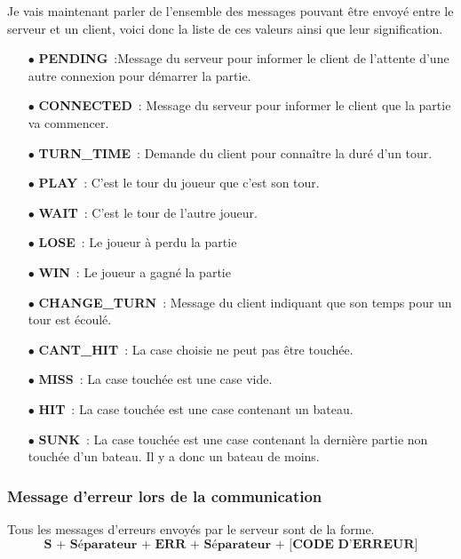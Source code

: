 \documentclass[12pt]{article}
\begin{document}
Je vais maintenant parler de l'ensemble des messages pouvant être envoyé entre
le serveur et un client, voici donc la liste de ces valeurs ainsi que leur
signification.
\begin{itemize}
      \item[$\bullet$] \textbf{PENDING} :Message du serveur pour informer
            le client de l'attente d'une autre connexion pour démarrer la
            partie.
            \bigskip
      \item[$\bullet$] \textbf{CONNECTED} : Message du serveur pour
            informer le client que la partie va commencer.
            \bigskip
      \item[$\bullet$] \textbf{TURN\_TIME} : Demande du client pour
            connaître la duré d'un tour.
            \bigskip
      \item[$\bullet$] \textbf{PLAY} : C'est le tour du joueur que c'est
            son tour.
            \bigskip
      \item[$\bullet$] \textbf{WAIT} : C'est le tour de l'autre joueur.
            \bigskip
      \item[$\bullet$] \textbf{LOSE} : Le joueur à perdu la partie
            \bigskip
      \item[$\bullet$] \textbf{WIN} : Le joueur a gagné la partie
            \bigskip
      \item[$\bullet$] \textbf{CHANGE\_TURN} : Message du client
            indiquant que son temps pour un tour est écoulé.
            \bigskip
      \item[$\bullet$] \textbf{CANT\_HIT} : La case choisie ne peut pas
            être touchée.
            \bigskip
      \item[$\bullet$] \textbf{MISS} : La case touchée est une case vide.
            \bigskip
      \item[$\bullet$] \textbf{HIT} : La case touchée est une case
            contenant un bateau.
            \bigskip
      \item[$\bullet$] \textbf{SUNK} : La case touchée est une case
            contenant la dernière partie non touchée d'un bateau. Il y a donc
            un bateau de
            moins.
            \bigskip
\end{itemize}

\bigskip

\subsubsection{Message d'erreur lors de la communication}
Tous les messages d'erreurs envoyés par le serveur sont de la forme.
\[
      \textbf{S + Séparateur + ERR + Séparateur + [CODE D'ERREUR]}
\]
\end{document}
